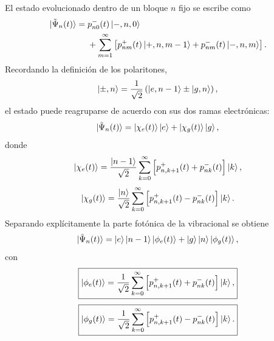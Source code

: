 El estado evolucionado dentro de un bloque $n$ fijo se escribe como
\begin{equation}
\begin{aligned}
  \ket{\tilde\Psi_n(t)}
  ={}&
  p_{n0}^{-}(t)\ket{-,n,0}
  \\
  &+
  \sum_{m=1}^{\infty}
  \left[
  p_{nm}^{+}(t)\ket{+,n,m-1}
  +
  p_{nm}^{-}(t)\ket{-,n,m}
  \right].
\end{aligned}
\end{equation}
Recordando la definici\'on de los polaritones,
\begin{equation}
  \ket{\pm,n}
  =
  \frac{1}{\sqrt2}
  \left(
  \ket{e,n-1}\pm\ket{g,n}
  \right),
\end{equation}
el estado puede reagruparse de acuerdo con sus dos ramas electr\'onicas:
\begin{equation}
  \ket{\tilde\Psi_n(t)}
  =
  \ket{\chi_e(t)}\ket e
  +
  \ket{\chi_g(t)}\ket g,
\end{equation}
donde
\begin{equation}
  \ket{\chi_e(t)}
  =
  \frac{\ket{n-1}}{\sqrt2}
  \sum_{k=0}^{\infty}
  \left[
  p_{n,k+1}^{+}(t)+p_{nk}^{-}(t)
  \right]\ket k,
\end{equation}
\begin{equation}
  \ket{\chi_g(t)}
  =
  \frac{\ket n}{\sqrt2}
  \sum_{k=0}^{\infty}
  \left[
  p_{n,k+1}^{+}(t)-p_{nk}^{-}(t)
  \right]\ket k.
\end{equation}
Separando expl\'icitamente la parte fot\'onica de la vibracional se obtiene
\begin{equation}
  \ket{\tilde\Psi_n(t)}
  =
  \ket e\ket{n-1}\ket{\phi_e(t)}
  +
  \ket g\ket n\ket{\phi_g(t)},
\end{equation}
con
\begin{equation}
  \boxed{
  \ket{\phi_e(t)}
  =
  \frac{1}{\sqrt2}
  \sum_{k=0}^{\infty}
  \left[
  p_{n,k+1}^{+}(t)+p_{nk}^{-}(t)
  \right]\ket k,
  }
\end{equation}
\begin{equation}
  \boxed{
  \ket{\phi_g(t)}
  =
  \frac{1}{\sqrt2}
  \sum_{k=0}^{\infty}
  \left[
  p_{n,k+1}^{+}(t)-p_{nk}^{-}(t)
  \right]\ket k.
  }
\end{equation}

